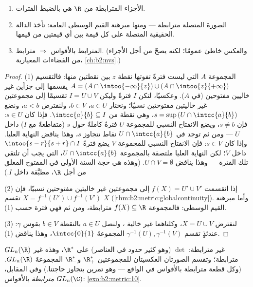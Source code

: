 \begin{theorem}\label{thm:b2:metric:connectedness}
\begin{enumerate}
  \item الأجزاء المترابطة من $\R$ هي بالضبط الفترات.
  \item الصورة المتصلة  مترابطة ---
        ومنها مبرهنة القيم الوسطى العامة: تأخذ الدالة الحقيقية
        المتصلة على  كل قيمة بين
        أي قيمتين من قيمها.
  \item المترابط بالأقواس $\Rightarrow$ مترابط. (والعكس خاطئ
        عمومًا؛ لكنه يصحّ من أجل الأجزاء  من الفضاءات المعيارية،
        \cref{ch:b2:nvs}.)
\end{enumerate}
\end{theorem}

\begin{proof}
(1) المجموعة $A$ التي ليست فترةً تفوتها نقطة $z$ بين نقطتين منها:
فالتقسيم
$A = (A \cap \intoo{-\infty}{z}) \cup (A \cap \intoo{z}{+\infty})$
يقسمها إلى جزأين غير خاليين مفتوحين (في $A$). وعكسيًا، لتكن
$I$ فترةً وليكن $I = U \cup V$ تقسيمًا إلى مجموعتين غير خاليتين
مفتوحتين نسبيًا؛ ونختار $a \in U$، $b \in V$، ولنفترض $a < b$،
ونضع $s = \sup\,(U \cap \intcc{a}{b})$، وهي نقطة من $\intcc{a}{b}
\subseteq I$. فإذا كان $s \in U$: فإن $s \neq b$، ويضع الانفتاح النسبي
للمجموعة $U$ فترةً كاملةً حول $s$ (متقاطعةً مع $I$)
داخل $U$ --- ومن ثم توجد في $U \cap \intcc{a}{b}$ نقاط تتجاوز $s$،
وهذا يناقض النهاية العليا. وإذا كان $s \in V$: فإن الانفتاح النسبي للمجموعة $V$
يضع فترةً $\intoo{s - r}{s + r} \cap I$ داخل $V$؛ لكن النهاية
العليا ملتصقة بالمجموعة $U \cap \intcc{a}{b}$، التي يجب أن تلتقي تلك
الفترة --- وهذا يناقض $U \cap V = \emptyset$. (وهذه هي
حجة السنة الأولى في المفتوح المغلق من أجل $\R$، مطبَّقة داخل $I$.)

(2) إذا انقسمت $f(X) = U' \cup V'$ إلى مجموعتين غير خاليتين مفتوحتين
نسبيًا، فإن $X = f^{-1}(U') \cup f^{-1}(V')$ تقسم $X$
(\cref{thm:b2:metric:globalcontinuity}). وأما مبرهنة القيم الوسطى: فالمجموعة $f(X) \subseteq \R$
مترابطة، ومن ثم فهي فترة حسب (1).

(3) لنفترض $X = U \cup V$، وكلتاهما غير خالية ، ولنصل $a \in U$
بالنقطة $b \in V$ بقوس $\gamma$: عندئذٍ تقسم $\gamma^{-1}(U),
\gamma^{-1}(V)$ المجموعةَ $\intcc{0}{1}$، وهذا يناقض (1).
\end{proof}

\begin{example}\label{ex:b2:metric:glnr}
$GL_n(\R)$ غير مترابطة:  $\det$  (وهو كثير حدود في
العناصر) على $\R^*$، وهذه غير مترابطة؛ وتقسم الصورتان العكسيتان
للمجموعتين $\R_+^*$ و$\R_-^*$ المجموعةَ $GL_n(\R)$. (وكل قطعة مترابطة بالأقواس
في الواقع --- وهو تمرين  يتجاوز حاجتنا.) وفي
المقابل، $GL_n(\C)$ \emph{مترابطة} بالأقواس:
\cref{exo:b2:metric:10}.
\end{example}


